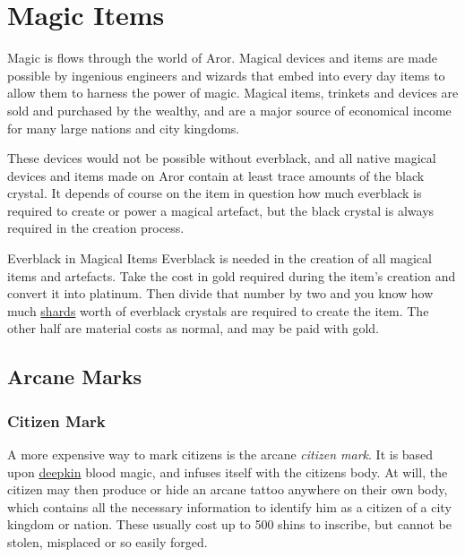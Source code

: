 \section{Magic Items}
\label{sec:Magic Items}

Magic is flows through the world of Aror. Magical devices and items
are made possible by ingenious engineers and wizards that embed
 into every day items to allow them to harness
the power of magic. Magical items, trinkets and devices are sold and
purchased by the wealthy, and are a major source of economical income
for many large nations and city kingdoms.

These devices would not be possible without everblack, and all native
magical devices and items made on Aror contain at least trace amounts
of the black crystal. It depends of course on the item in question how
much everblack is required to create or power a magical artefact, but
the black crystal is always required in the creation process.

\begin{35e}{Everblack in Magical Items}
  Everblack is needed in the creation of all magical items and artefacts.
  Take the cost in gold required during the item's creation and convert
  it into platinum. Then divide that number by two and you know how much
  \hyperref[sec:Shard]{shards} worth of everblack crystals are required to
  create the item. The other half are material costs as normal, and may be
  paid with gold.
\end{35e}

\subsection{Arcane Marks}
\label{sec:Arcane Marks}

\subsubsection{Citizen Mark}
\label{sec:Citizen Mark}

A more expensive way to mark citizens is the arcane \emph{citizen mark}. It is
based upon \hyperref[sec:Deepkin]{deepkin} blood magic, and infuses itself
with the citizens body. At will, the citizen may then produce or hide an
arcane tattoo anywhere on their own body, which contains all the necessary
information to identify him as a citizen of a city kingdom or nation. These
usually cost up to 500 shins to inscribe, but cannot be stolen, misplaced or
so easily forged.

